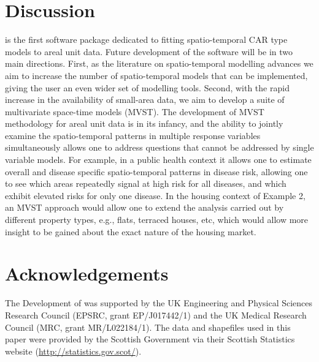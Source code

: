 \documentclass[article, nojss]{jss}
\begin{document}
\section{Discussion}\label{section7}
 is the first software package dedicated to fitting spatio-temporal CAR type models to areal unit data. Future development of the software will be in two main directions. First, as the literature on spatio-temporal modelling advances we aim to increase the number of spatio-temporal models that can be implemented, giving the user an even wider set of modelling tools. Second, with the rapid increase in the availability of small-area data, we aim to develop a suite of multivariate space-time models (MVST). The development of MVST methodology for areal unit data is in its infancy, and the ability to jointly examine the spatio-temporal patterns in multiple response variables simultaneously allows one to address questions that cannot be addressed by single variable models. For example, in a public health context it allows one to estimate overall and disease specific spatio-temporal  patterns in disease risk, allowing one to see which areas repeatedly signal at high risk for all diseases, and which exhibit elevated risks for only one disease. In the housing context of Example 2, an MVST approach would allow one to extend the analysis carried out by different property types, e.g., flats, terraced houses, etc, which would allow more insight to be gained about the exact nature of the housing market.  





\section{Acknowledgements}
The Development of  was supported by the UK Engineering and Physical Sciences Research Council (EPSRC, grant EP/J017442/1) and the UK Medical Research Council (MRC, grant MR/L022184/1). The data and shapefiles used in this paper were provided by the Scottish Government via their Scottish Statistics website (\url{http://statistics.gov.scot/}).



\end{document}

